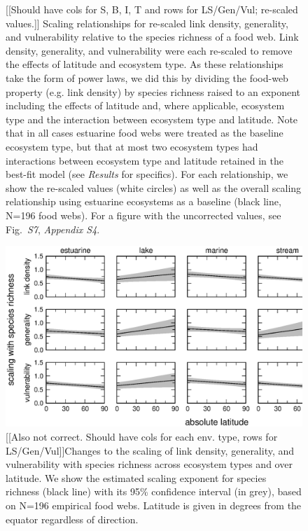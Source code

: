 \documentclass[12pt]{article}
\begin{document}
\begin{figure}[h]
\caption{[[Should have cols for S, B, I, T and rows for LS/Gen/Vul; re-scaled values.]]
Scaling relationships for re-scaled link density, generality, and vulnerability 
relative to the species richness of a food web. Link density, generality,
and vulnerability were each re-scaled to remove the effects of latitude and ecosystem
type. As these relationships take the form of power laws, we did this by dividing the food-web
property (e.g. link density) by species richness raised to an exponent including the 
effects of latitude and, where applicable, ecosystem type and the interaction between ecosystem
type and latitude. Note that in all cases estuarine food webs were treated as the baseline 
ecosystem type, but that at most two ecosystem types had interactions between ecosystem type and
latitude retained in the best-fit model (see \emph{Results} for specifics). For each relationship, 
we show the re-scaled values (white circles) as well as the overall scaling relationship using estuarine
ecosystems as a baseline (black line, N=196 food webs). For a figure with the uncorrected values,
see Fig.~\emph{S7}, \emph{Appendix S4}.}
\label{props_v_lat}
\end{figure}


\begin{figure}[h]
\centerline{\includegraphics*[width=.85\textwidth]{Figures/by_TL/marginal/S_marginal_latitude_non_TS_corrected.eps}}
\caption{[[Also not correct. Should have cols for each env. type, rows for LS/Gen/Vul]]Changes to the scaling of link density, generality, and vulnerability with species richness across ecosystem
types and over latitude. We show the estimated scaling exponent for species richness (black
line) with its 95\% confidence interval (in grey), based on N=196 empirical food webs.
Latitude is given in degrees from the equator regardless of direction.} \label{S} \end{figure}
\end{document}
